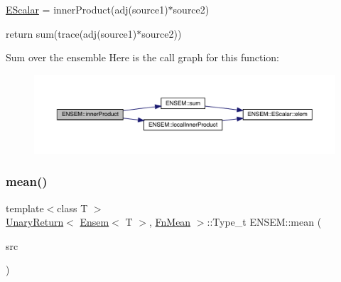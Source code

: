 \mbox{\hyperlink{classENSEM_1_1EScalar}{E\+Scalar}} = inner\+Product(adj(source1)$\ast$source2) 

return sum(trace(adj(source1)$\ast$source2))

Sum over the ensemble Here is the call graph for this function\+:\nopagebreak
\begin{figure}[H]
\begin{center}
\leavevmode
\includegraphics[width=350pt]{d2/d94/namespaceENSEM_a27e5add94db1e27059d44144e3a3fb99_cgraph}
\end{center}
\end{figure}
\mbox{\label{namespaceENSEM_a57df5bdf8770d89f824a3898e08c2d81}} 
\subsubsection{\texorpdfstring{mean()}{mean()}}
{\footnotesize\ttfamily template$<$class T $>$ \\
\mbox{\hyperlink{structENSEM_1_1UnaryReturn}{Unary\+Return}}$<$ \mbox{\hyperlink{classENSEM_1_1Ensem}{Ensem}}$<$ T $>$, \mbox{\hyperlink{structENSEM_1_1FnMean}{Fn\+Mean}} $>$\+::Type\+\_\+t E\+N\+S\+E\+M\+::mean (\begin{DoxyParamCaption}\item[{const \mbox{\hyperlink{classENSEM_1_1Ensem}{Ensem}}$<$ T $>$ \&}]{src }\end{DoxyParamCaption})\hspace{0.3cm}{\ttfamily [inline]}}

